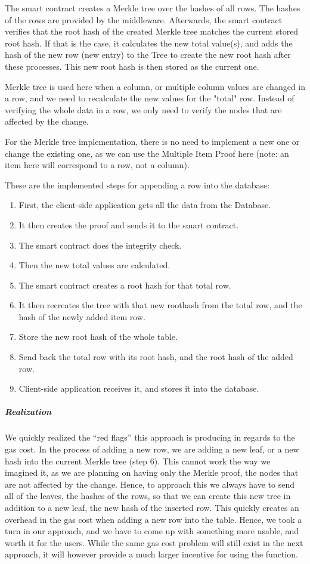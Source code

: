 The smart contract creates a Merkle tree over the hashes of all rows. The hashes of the rows are provided by the middleware. Afterwards, the smart contract verifies that the root hash of the created Merkle tree matches the current stored root hash. If that is the case, it calculates the new total value(s), and adds the hash of the new row (new entry) to the Tree to create the new root hash after these processes. This new root hash is then stored as the current one.

Merkle tree is used here when a column, or multiple column values are changed in a row, and we need to recalculate the new values for the "total" row. Instead of verifying the whole data in a row, we only need to verify the nodes that are affected by the change.

For the Merkle tree implementation, there is no need to implement a new one or change the existing one, as we can use the Multiple Item Proof here (note: an item here will correspond to a row, not a column).

These are the implemented steps for appending a row into the database:
\begin{enumerate}
	\item First, the client-side application gets all the data from the Database.
	\item It then creates the proof and sends it to the smart contract.
	\item The smart contract does the integrity check.
	\item Then the new total values are calculated.
	\item The smart contract creates a root hash for that total row.
	\item It then recreates the tree with that new roothash from the total row, and the hash of the newly added item row.
	\item Store the new root hash of the whole table.
	\item Send back the total row with its root hash, and the root hash of the added row.
	\item Client-side application receives it, and stores it into the database.
\end{enumerate}

\subparagraph{Realization}

We quickly realized the “red flags” this approach is producing in regards to the gas cost. In the process of adding a new row, we are adding a new leaf, or a new hash into the current Merkle tree (step 6). This cannot work the way we imagined it, as we are planning on having only the Merkle proof, the nodes that are not affected by the change. Hence, to approach this we always have to send all of the leaves, the hashes of the rows, so that we can create this new tree in addition to a new leaf, the new hash of the inserted row. This quickly creates an overhead in the gas cost when adding a new row into the table. Hence, we took a turn in our approach, and we have to come up with something more usable, and worth it for the users. While the same gas cost problem will still exist in the next approach, it will however provide a much larger incentive for using the function.

